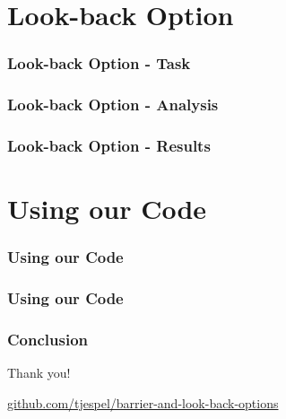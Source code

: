 \documentclass[11pt]{beamer}
\begin{document}
\section{Look-back Option}
\begin{frame}
\frametitle{Look-back Option - Task}

\end{frame}

\begin{frame}
\frametitle{Look-back Option - Analysis}
\end{frame}

\begin{frame}
\frametitle{Look-back Option - Results}

\end{frame}


\section{Using our Code}
\begin{frame}
\frametitle{Using our Code}

\end{frame}
\begin{frame}
\frametitle{Using our Code}

\end{frame}



\begin{frame}
\frametitle{Conclusion}

\end{frame}



\begin{frame}

\centering
{\Large Thank you!}

{\small\url{github.com/tjespel/barrier-and-look-back-options}}
\end{frame}
\end{document}
